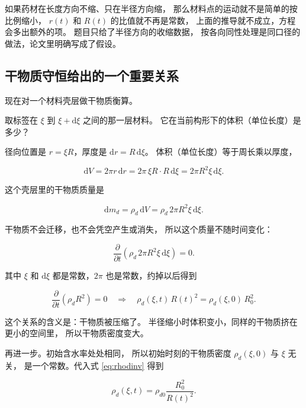 如果药材在长度方向不缩、只在半径方向缩，
那么材料点的运动就不是简单的按比例缩小，
$r(t)$ 和 $R(t)$ 的比值就不再是常数，
上面的推导就不成立，方程会多出额外的项。
题目只给了半径方向的收缩数据，
按各向同性处理是同口径的做法，论文里明确写成了假设。

\subsection{干物质守恒给出的一个重要关系}

现在对一个材料壳层做干物质衡算。

取标签在 $\xi$ 到 $\xi+\mathrm{d}\xi$ 之间的那一层材料。
它在当前构形下的体积（单位长度）是多少？

径向位置是 $r=\xi R$，厚度是 $\mathrm{d}r = R\,\mathrm{d}\xi$。
体积（单位长度）等于周长乘以厚度，

\begin{equation}
\mathrm{d}V = 2\pi r\,\mathrm{d}r = 2\pi\,\xi R\cdot R\,\mathrm{d}\xi
= 2\pi R^2\xi\,\mathrm{d}\xi .
\end{equation}

这个壳层里的干物质质量是

\begin{equation}
\mathrm{d}m_d = \rho_d\,\mathrm{d}V = \rho_d\,2\pi R^2\xi\,\mathrm{d}\xi .
\end{equation}

干物质不会迁移，也不会凭空产生或消失，
所以这个质量不随时间变化：

\begin{equation}
\frac{\partial}{\partial t}\left(\rho_d\,2\pi R^2\xi\,\mathrm{d}\xi\right) = 0 .
\end{equation}

其中 $\xi$ 和 $\mathrm{d}\xi$ 都是常数，$2\pi$ 也是常数，约掉以后得到

\begin{equation}
\frac{\partial}{\partial t}\left(\rho_d R^2\right) = 0
\quad\Longrightarrow\quad
\rho_d(\xi,t)\,R(t)^2 = \rho_d(\xi,0)\,R_0^2 .
\label{eq:rhodinv}
\end{equation}

这个关系的含义是：干物质被压缩了。
半径缩小时体积变小，同样的干物质挤在更小的空间里，
所以干物质密度变大。

再进一步。初始含水率处处相同，
所以初始时刻的干物质密度 $\rho_d(\xi,0)$ 与 $\xi$ 无关，
是一个常数。代入式 \eqref{eq:rhodinv} 得到

\begin{equation}
\rho_d(\xi,t) = \rho_{d0}\frac{R_0^2}{R(t)^2} .
\label{eq:rhodconst}
\end{equation}

